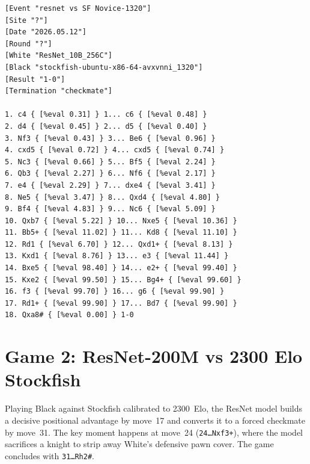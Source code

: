 \begin{verbatim}
[Event "resnet vs SF Novice-1320"]
[Site "?"]
[Date "2026.05.12"]
[Round "?"]
[White "ResNet_10B_256C"]
[Black "stockfish-ubuntu-x86-64-avxvnni_1320"]
[Result "1-0"]
[Termination "checkmate"]

1. c4 { [%eval 0.31] } 1... c6 { [%eval 0.48] } 
2. d4 { [%eval 0.45] } 2... d5 { [%eval 0.40] } 
3. Nf3 { [%eval 0.43] } 3... Be6 { [%eval 0.96] } 
4. cxd5 { [%eval 0.72] } 4... cxd5 { [%eval 0.74] } 
5. Nc3 { [%eval 0.66] } 5... Bf5 { [%eval 2.24] } 
6. Qb3 { [%eval 2.27] } 6... Nf6 { [%eval 2.17] } 
7. e4 { [%eval 2.29] } 7... dxe4 { [%eval 3.41] } 
8. Ne5 { [%eval 3.47] } 8... Qxd4 { [%eval 4.80] } 
9. Bf4 { [%eval 4.83] } 9... Nc6 { [%eval 5.09] } 
10. Qxb7 { [%eval 5.22] } 10... Nxe5 { [%eval 10.36] } 
11. Bb5+ { [%eval 11.02] } 11... Kd8 { [%eval 11.10] } 
12. Rd1 { [%eval 6.70] } 12... Qxd1+ { [%eval 8.13] }
13. Kxd1 { [%eval 8.76] } 13... e3 { [%eval 11.44] } 
14. Bxe5 { [%eval 98.40] } 14... e2+ { [%eval 99.40] } 
15. Kxe2 { [%eval 99.50] } 15... Bg4+ { [%eval 99.60] }
16. f3 { [%eval 99.70] } 16... g6 { [%eval 99.90] } 
17. Rd1+ { [%eval 99.90] } 17... Bd7 { [%eval 99.90] } 
18. Qxa8# { [%eval 0.00] } 1-0
\end{verbatim}

\section{Game 2: ResNet-200M vs 2300 Elo Stockfish}
\label{app:game2}

Playing Black against Stockfish calibrated to 2300~Elo, the ResNet model builds a decisive positional advantage by move~17 and converts it to a forced checkmate by move~31.
The key moment happens at move~24 (\texttt{24\ldots Nxf3+}), where the model sacrifices a knight to strip away White's defensive pawn cover.
The game concludes with \texttt{31\ldots Rh2\#}.

